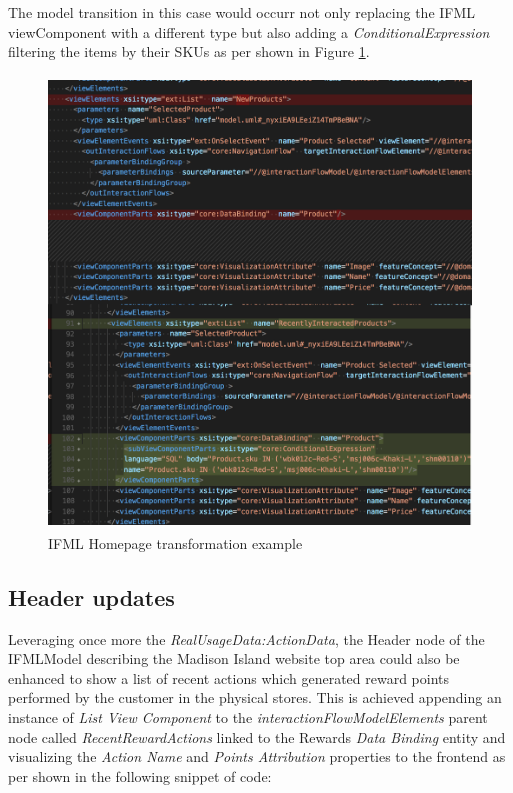 The model transition in this case would occurr not only replacing the IFML viewComponent with a different type but also adding a \textit{ConditionalExpression} filtering the items by their SKUs as per shown in Figure \ref{fig:ifml-transformation-example}.

\vspace{0.5cm}
\begin{figure}[H]
  \centering
    \includegraphics[height=12cm]{images/madison/ifm-homepage-transformation.png}
  \caption{IFML Homepage transformation example}
  \label{fig:ifml-transformation-example}
\end{figure}
\vspace{0.5cm}

\subsection{Header updates}

Leveraging once more the \textit{RealUsageData:ActionData}, the Header node of the IFMLModel describing the Madison Island website top area could also be enhanced to show a list of recent actions which generated reward points performed by the customer in the physical stores.  This is achieved appending  an instance of \textit{List View Component} to the \textit{interactionFlowModelElements} parent node called \textit{RecentRewardActions} linked to the Rewards \textit{Data Binding} entity and visualizing the \textit{Action Name} and \textit{Points Attribution} properties to the frontend as per shown in the following snippet of code:

